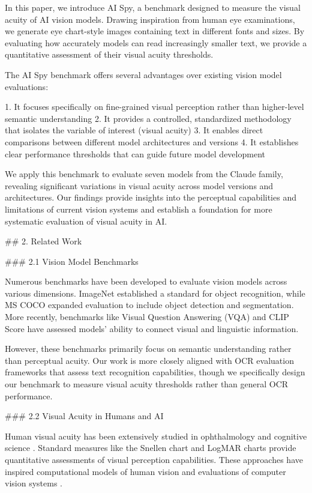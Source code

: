 \documentclass{article}
\begin{document}
In this paper, we introduce AI Spy, a benchmark designed to measure the visual acuity of AI vision models. Drawing inspiration from human eye examinations, we generate eye chart-style images containing text in different fonts and sizes. By evaluating how accurately models can read increasingly smaller text, we provide a quantitative assessment of their visual acuity thresholds.

The AI Spy benchmark offers several advantages over existing vision model evaluations:

1. It focuses specifically on fine-grained visual perception rather than higher-level semantic understanding
2. It provides a controlled, standardized methodology that isolates the variable of interest (visual acuity)
3. It enables direct comparisons between different model architectures and versions
4. It establishes clear performance thresholds that can guide future model development

We apply this benchmark to evaluate seven models from the Claude family, revealing significant variations in visual acuity across model versions and architectures. Our findings provide insights into the perceptual capabilities and limitations of current vision systems and establish a foundation for more systematic evaluation of visual acuity in AI.

## 2. Related Work

### 2.1 Vision Model Benchmarks

Numerous benchmarks have been developed to evaluate vision models across various dimensions. ImageNet \cite{deng2009imagenet} established a standard for object recognition, while MS COCO \cite{lin2014microsoft} expanded evaluation to include object detection and segmentation. More recently, benchmarks like Visual Question Answering (VQA) \cite{antol2015vqa} and CLIP Score \cite{radford2021learning} have assessed models' ability to connect visual and linguistic information.

However, these benchmarks primarily focus on semantic understanding rather than perceptual acuity. Our work is more closely aligned with OCR evaluation frameworks \cite{karatzas2015icdar} that assess text recognition capabilities, though we specifically design our benchmark to measure visual acuity thresholds rather than general OCR performance.

### 2.2 Visual Acuity in Humans and AI

Human visual acuity has been extensively studied in ophthalmology and cognitive science \cite{westheimer1979scaling}. Standard measures like the Snellen chart and LogMAR charts provide quantitative assessments of visual perception capabilities. These approaches have inspired computational models of human vision \cite{geisler2011contributions} and evaluations of computer vision systems \cite{dodge2012human}.
\end{document}
